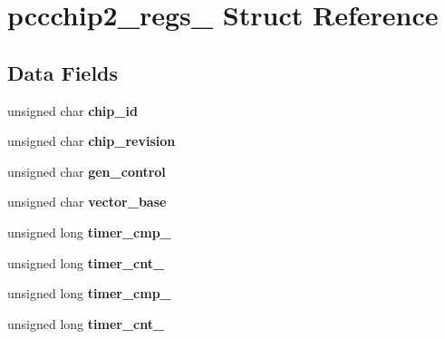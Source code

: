 \hypertarget{structpccchip2__regs__}{}\section{pccchip2\+\_\+regs\+\_\+ Struct Reference}
\label{structpccchip2__regs__}
\subsection*{Data Fields}
\begin{DoxyCompactItemize}
\item 
\mbox{\label{structpccchip2__regs___a3fed02f386cf82b4bf29398ccfd490ff}} 
unsigned char {\bfseries chip\+\_\+id}
\item 
\mbox{\label{structpccchip2__regs___a7d5b22bcc2d2c3e2cba147f399ff2ea1}} 
unsigned char {\bfseries chip\+\_\+revision}
\item 
\mbox{\label{structpccchip2__regs___aeaed9ac843f94f9dc570436e876f2c27}} 
unsigned char {\bfseries gen\+\_\+control}
\item 
\mbox{\label{structpccchip2__regs___ab05d04284494fdf3fff1ebd99166e244}} 
unsigned char {\bfseries vector\+\_\+base}
\item 
\mbox{\label{structpccchip2__regs___aa941f18f37b377fe185af845184cdcd7}} 
unsigned long {\bfseries timer\+\_\+cmp\+\_}
\item 
\mbox{\label{structpccchip2__regs___a7a01c8498aba52d42bac162861f297ac}} 
unsigned long {\bfseries timer\+\_\+cnt\+\_}
\item 
\mbox{\label{structpccchip2__regs___a5b4be0084374ae0ed17cc0359e21b522}} 
unsigned long {\bfseries timer\+\_\+cmp\+\_}
\item 
\mbox{\label{structpccchip2__regs___ac71eb2672f915730bf1aeea701071693}} 
unsigned long {\bfseries timer\+\_\+cnt\+\_}
\item 
\mbox{\label{structpccchip2__regs___ab84012e0fd9f3aaa188afe8f7071c573}} 

\end{DoxyCompactItemize}
